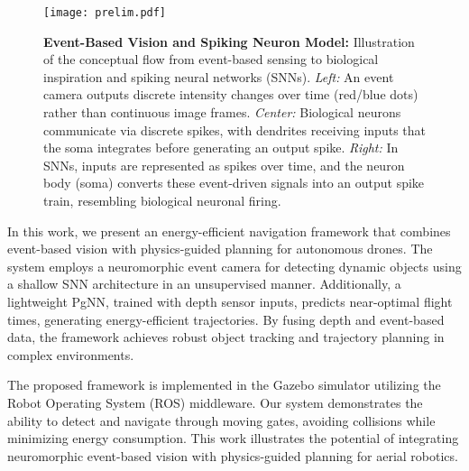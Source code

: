\begin{figure*}[!t]
  \centering
  \texttt{[image: prelim.pdf]}
  \caption{%
    \textbf{Event-Based Vision and Spiking Neuron Model:}
    Illustration of the conceptual flow from event-based sensing to biological inspiration
    and spiking neural networks (SNNs). 
    \textit{Left:} An event camera outputs discrete intensity changes over time (red/blue dots) 
    rather than continuous image frames.
    \textit{Center:} Biological neurons communicate via discrete spikes, with dendrites 
    receiving inputs that the soma integrates before generating an output spike. 
    \textit{Right:} In SNNs, inputs are represented as spikes over time, and the neuron body (soma) 
    converts these event-driven signals into an output spike train, resembling biological neuronal firing.
  }
  \label{fig:event_based_processing}
\end{figure*}

In this work, we present an energy-efficient navigation framework that combines event-based vision with physics-guided planning for autonomous drones.  The system employs a neuromorphic event camera for detecting dynamic objects using a shallow SNN architecture in an unsupervised manner. Additionally, a lightweight PgNN, trained with depth sensor inputs, predicts near-optimal flight times, generating energy-efficient trajectories. By fusing depth and event-based data, the framework achieves robust object tracking and trajectory planning in complex environments.

The proposed framework is implemented in the Gazebo simulator  utilizing the Robot Operating System (ROS) middleware. Our system demonstrates the ability to detect and navigate through moving gates, avoiding collisions while minimizing energy consumption.  This work illustrates the potential of integrating neuromorphic event-based vision with physics-guided planning for aerial robotics. 
